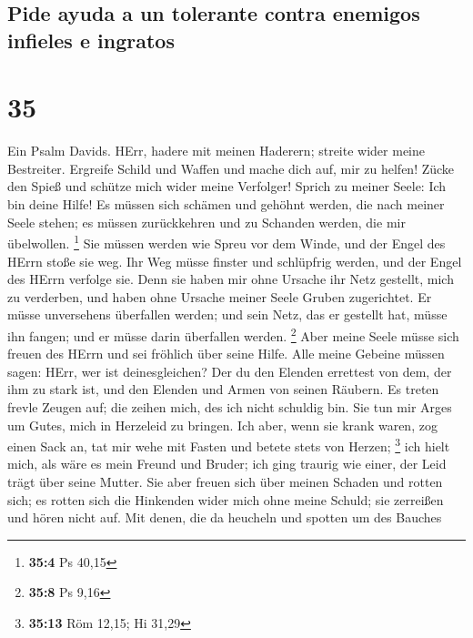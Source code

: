 \hypertarget{pide-ayuda-a-un-tolerante-contra-enemigos-infieles-e-ingratos}{%
\subsection{Pide ayuda a un tolerante contra enemigos infieles e
ingratos}\label{pide-ayuda-a-un-tolerante-contra-enemigos-infieles-e-ingratos}}

\hypertarget{section-34}{%
\section{35}\label{section-34}}

 Ein Psalm Davids. HErr, hadere mit meinen Haderern;
streite wider meine Bestreiter.  Ergreife Schild und
Waffen und mache dich auf, mir zu helfen!  Zücke den Spieß
und schütze mich wider meine Verfolger! Sprich zu meiner Seele: Ich bin
deine Hilfe!  Es müssen sich schämen und gehöhnt werden,
die nach meiner Seele stehen; es müssen zurückkehren und zu Schanden
werden, die mir übelwollen. \footnote{\textbf{35:4} Ps 40,15}
 Sie müssen werden wie Spreu vor dem Winde, und der Engel
des HErrn stoße sie weg.  Ihr Weg müsse finster und
schlüpfrig werden, und der Engel des HErrn verfolge sie. 
Denn sie haben mir ohne Ursache ihr Netz gestellt, mich zu verderben,
und haben ohne Ursache meiner Seele Gruben zugerichtet. 
Er müsse unversehens überfallen werden; und sein Netz, das er gestellt
hat, müsse ihn fangen; und er müsse darin überfallen werden. \footnote{\textbf{35:8}
  Ps 9,16}  Aber meine Seele müsse sich freuen des HErrn
und sei fröhlich über seine Hilfe.  Alle meine Gebeine
müssen sagen: HErr, wer ist deinesgleichen? Der du den Elenden errettest
von dem, der ihm zu stark ist, und den Elenden und Armen von seinen
Räubern.  Es treten frevle Zeugen auf; die zeihen mich,
des ich nicht schuldig bin.  Sie tun mir Arges um Gutes,
mich in Herzeleid zu bringen.  Ich aber, wenn sie krank
waren, zog einen Sack an, tat mir wehe mit Fasten und betete stets von
Herzen; \footnote{\textbf{35:13} Röm 12,15; Hi 31,29} 
ich hielt mich, als wäre es mein Freund und Bruder; ich ging traurig wie
einer, der Leid trägt über seine Mutter.  Sie aber freuen
sich über meinen Schaden und rotten sich; es rotten sich die Hinkenden
wider mich ohne meine Schuld; sie zerreißen und hören nicht auf.
 Mit denen, die da heucheln und spotten um des Bauches
